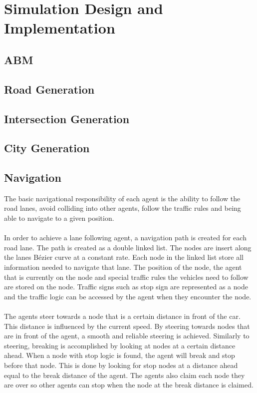 \section{Simulation Design and Implementation}

\subsection{ABM}

\subsection{Road Generation}

\subsection{Intersection Generation}

\subsection{City Generation}

\subsection{Navigation}
The basic navigational responsibility of each agent is the ability to follow the road lanes, avoid colliding into other agents, follow the traffic rules and being able to navigate to a given position.
\\\\
In order to achieve a lane following agent, a navigation path is created for each road lane. The path is created as a double linked list. The nodes are insert along the lanes Bézier curve at a constant rate. Each node in the linked list store all information needed to navigate that lane. The position of the node, the agent that is currently on the node and special traffic rules the vehicles need to follow are stored on the node. Traffic signs such as stop sign are represented as a node and the traffic logic can be accessed by the agent when they encounter the node. 
\\\\
The agents steer towards a node that is a certain distance in front of the car. This distance is influenced by the current speed. By steering towards nodes that are in front of the agent, a smooth and reliable steering is achieved. Similarly to steering, breaking is accomplished by looking at nodes at a certain distance ahead. When a node with stop logic is found, the agent will break and stop before that node. This is done by looking for stop nodes at a distance ahead equal to the break distance of the agent. The agents also claim each node they are over so other agents can stop when the node at the break distance is claimed.                                                
\\\\

